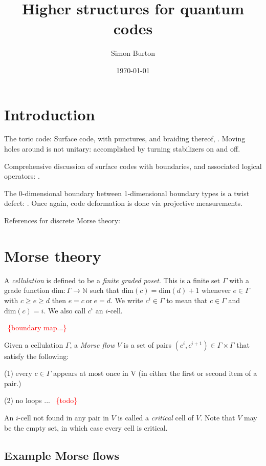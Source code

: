 \documentclass[11pt,oneside]{article}
\title{Higher structures for quantum codes}
\author{Simon Burton}
\date{\today}
\newcommand{\todo}[1]{\ \textcolor{red}{\{#1\}}\ }
\begin{document}
\maketitle


\section{Introduction}

The toric code: \cite{Dennis2002}
Surface code, with punctures, and braiding thereof, \cite{Fowler2012}.
Moving holes around is not unitary: accomplished by turning stabilizers on
and off.

Comprehensive discussion of surface codes with boundaries, and
associated logical operators: \cite{Delfosse2016}.

The 0-dimensional boundary between 1-dimensional
boundary types is a twist defect:
\cite{Brown2017}.
Once again, code deformation is done via projective
measurements.

References for discrete Morse theory: \cite{Forman1998,Forman2002,Ghrist2014}


\section{Morse theory}

A {\it cellulation} is defined to be a {\it finite graded poset}.
This is a finite set $\Gamma$
with a grade function $\text{dim}:\Gamma\to\mathbb{N}$
such that $\text{dim}(c)=\text{dim}(d)+1$
whenever $e\in\Gamma$ with $c\ge e\ge d$ then $e=c \ \text{or}\  e=d.$
We write $c^i \in\Gamma$ to mean that $c\in\Gamma$ and $\text{dim}(c)=i.$
We also call $c^i$ an $i$-cell.

\todo{boundary map...}

Given a cellulation $\Gamma$, a {\it Morse flow} $V$ is
a set of pairs $(c^i, c^{i+1}) \in \Gamma\times\Gamma$
that satisfy the following:

(1) every $c\in\Gamma$ appears at most once in V (in either the first or
second item of a pair.)

(2) no loops ... \todo{todo}

An $i$-cell not found in any pair in $V$ is called a 
{\it critical} cell of $V.$
Note that $V$ may be the empty set, in which case
every cell is critical.

\subsection{Example Morse flows}
\end{document}
